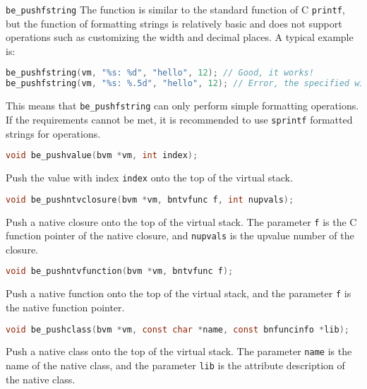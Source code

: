 \texttt{be\_pushfstring} The function is similar to the standard function of C \texttt{printf}, but the function of formatting strings is relatively basic and does not support operations such as customizing the width and decimal places. A typical example is:
\begin{lstlisting}[language=c, style=berry, numbers=none]
be_pushfstring(vm, "%s: %d", "hello", 12); // Good, it works!
be_pushfstring(vm, "%s: %.5d", "hello", 12); // Error, the specified width is not supported.
\end{lstlisting}
This means that \texttt{be\_pushfstring} can only perform simple formatting operations. If the requirements cannot be met, it is recommended to use \texttt{sprintf} formatted strings for operations.


\begin{lstlisting}[language=c, style=berry, numbers=none]
void be_pushvalue(bvm *vm, int index);
\end{lstlisting}

Push the value with index \texttt{index} onto the top of the virtual stack.


\begin{lstlisting}[language=c, style=berry, numbers=none]
void be_pushntvclosure(bvm *vm, bntvfunc f, int nupvals);
\end{lstlisting}

Push a native closure onto the top of the virtual stack. The parameter \texttt{f} is the C function pointer of the native closure, and \texttt{nupvals} is the upvalue number of the closure.


\begin{lstlisting}[language=c, style=berry, numbers=none]
void be_pushntvfunction(bvm *vm, bntvfunc f);
\end{lstlisting}

Push a native function onto the top of the virtual stack, and the parameter \texttt{f} is the native function pointer.


\begin{lstlisting}[language=c, style=berry, numbers=none]
void be_pushclass(bvm *vm, const char *name, const bnfuncinfo *lib);
\end{lstlisting}

Push a native class onto the top of the virtual stack. The parameter \texttt{name} is the name of the native class, and the parameter \texttt{lib} is the attribute description of the native class.

